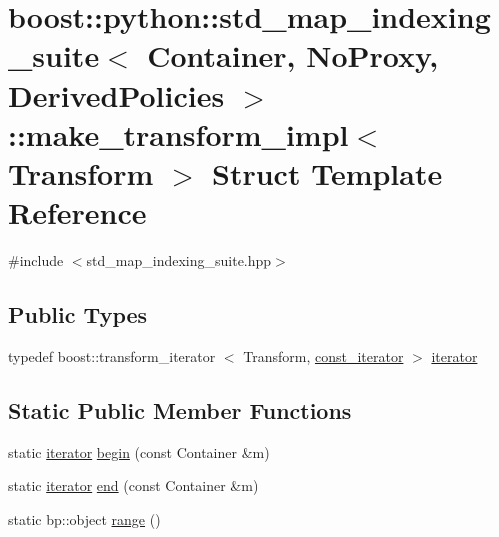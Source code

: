 \hypertarget{structboost_1_1python_1_1std__map__indexing__suite_1_1make__transform__impl}{\section{boost\-:\-:python\-:\-:std\-\_\-map\-\_\-indexing\-\_\-suite$<$ \-Container, \-No\-Proxy, \-Derived\-Policies $>$\-:\-:make\-\_\-transform\-\_\-impl$<$ \-Transform $>$ \-Struct \-Template \-Reference}
\label{structboost_1_1python_1_1std__map__indexing__suite_1_1make__transform__impl}
}


{\ttfamily \#include $<$std\-\_\-map\-\_\-indexing\-\_\-suite.\-hpp$>$}

\subsection*{\-Public \-Types}
\begin{DoxyCompactItemize}
\item 
typedef \*
boost\-::transform\-\_\-iterator\*
$<$ \-Transform, \hyperlink{classboost_1_1python_1_1std__map__indexing__suite_aae0c4473455223a4e048cc207ca7b3ea}{const\-\_\-iterator} $>$ \hyperlink{structboost_1_1python_1_1std__map__indexing__suite_1_1make__transform__impl_a64d7b60f0e792533c1cc89b84f341b0d}{iterator}
\end{DoxyCompactItemize}
\subsection*{\-Static \-Public \-Member \-Functions}
\begin{DoxyCompactItemize}
\item 
static \hyperlink{structboost_1_1python_1_1std__map__indexing__suite_1_1make__transform__impl_a64d7b60f0e792533c1cc89b84f341b0d}{iterator} \hyperlink{structboost_1_1python_1_1std__map__indexing__suite_1_1make__transform__impl_ab74967f0d94cdc5adcae986110974656}{begin} (const \-Container \&m)
\item 
static \hyperlink{structboost_1_1python_1_1std__map__indexing__suite_1_1make__transform__impl_a64d7b60f0e792533c1cc89b84f341b0d}{iterator} \hyperlink{structboost_1_1python_1_1std__map__indexing__suite_1_1make__transform__impl_ac8c3535052a0a3320e73ab5b49eb6b82}{end} (const \-Container \&m)
\item 
static bp\-::object \hyperlink{structboost_1_1python_1_1std__map__indexing__suite_1_1make__transform__impl_a9dbcd293bf92f94f2eaeaed8edb64ee2}{range} ()
\end{DoxyCompactItemize}
